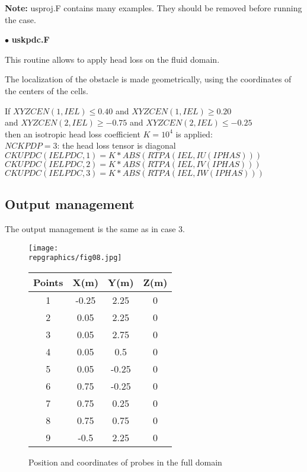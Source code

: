 \textbf{Note:} usproj.F contains many examples. They should be removed before
running the case.


$\bullet$ {\bfseries uskpdc.F}

This routine allows to apply head loss on the fluid domain.

The localization of the obstacle is made geometrically, using the
coordinates of the centers of the cells.


If $XYZCEN(1,IEL) \leq 0.40$ and $XYZCEN(1,IEL) \geq 0.20$ \\
and $XYZCEN(2,IEL) \geq -0.75$ and $XYZCEN(2,IEL) \leq -0.25$\\
then an isotropic head loss coefficient $K = 10^{4}$ is applied:\\

$NCKPDP = 3$: the head loss tensor is diagonal \\
$CKUPDC(IELPDC,1) = K*ABS(RTPA(IEL,IU(IPHAS)))$ \\
$CKUPDC(IELPDC,2) = K*ABS(RTPA(IEL,IV(IPHAS)))$ \\
$CKUPDC(IELPDC,3) = K*ABS(RTPA(IEL,IW(IPHAS)))$

        \subsection{Output management}

The output management is the same as in case 3.

\begin{figure}[htp]
\parbox{8cm}{%
\centerline{\texttt{[image: \\repgraphics/fig08.jpg]}}}
\parbox{7cm}{%
\begin{center}
\begin{tabular}{|c|c|c|c|}
\hline
Points & X(m) & Y(m) & Z(m)\\
\hline
1 & -0.25 & 2.25 & 0 \\
\hline
2 & 0.05 & 2.25 & 0 \\
\hline
3 & 0.05 & 2.75 & 0 \\
\hline
4 & 0.05 & 0.5 & 0 \\
\hline
5 & 0.05 & -0.25 & 0 \\
\hline
6 & 0.75 & -0.25 & 0 \\
\hline
7 & 0.75 & 0.25 & 0 \\
\hline
8 & 0.75 & 0.75 & 0 \\
\hline
9 & -0.5 & 2.25 & 0 \\
\hline
\end{tabular}
\end{center}
}
\caption{Position and coordinates of probes in the full domain}
\label{figante42}
\end{figure}

